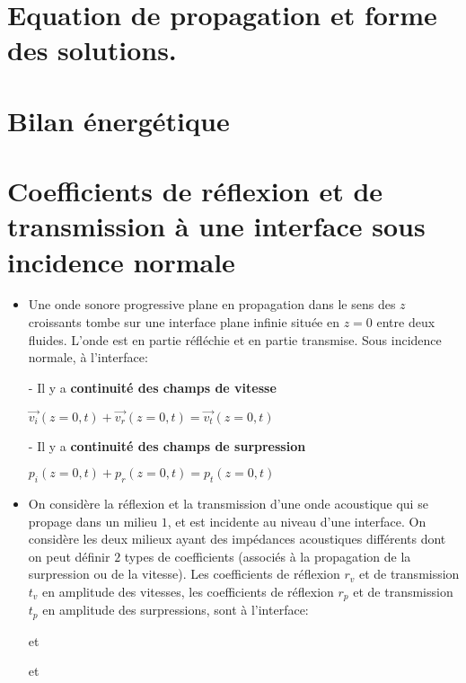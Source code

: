 \documentclass[a4paper]{article}
\begin{document}
\section{Equation de propagation et forme des solutions.}

\section{Bilan énergétique}

\section{Coefficients de réflexion et de transmission à une interface sous incidence normale}
\begin{itemize}
\item Une onde sonore progressive plane en propagation dans le sens des $z$ croissants tombe sur une interface plane infinie située en $z=0$ entre deux fluides. L'onde est en partie réfléchie et en partie transmise. Sous incidence normale, à l'interface:
\item[-] Il y a \textbf{continuité des champs de vitesse}
\begin{center}
$\overrightarrow{v_{i}}(z=0,t)+\overrightarrow{v_{r}}(z=0,t)=\overrightarrow{v_{t}}(z=0,t)$
\end{center}
\item[-] Il y a \textbf{continuité des champs de surpression}
\begin{center}
$p_{i}(z=0,t)+p_{r}(z=0,t)=p_{t}(z=0,t)$
\end{center}

\item On considère la réflexion et la transmission d'une onde acoustique qui se propage dans un milieu $1$, et est incidente au niveau d'une interface. On considère les deux milieux ayant des impédances acoustiques différents dont on peut définir $2$ types de coefficients (associés à la propagation de la surpression ou de la vitesse). Les coefficients de réflexion $r_{v}$ et de transmission $t_{v}$ en amplitude des vitesses, les coefficients de réflexion $r_{p}$ et de transmission $t_{p}$ en amplitude des surpressions, sont à l'interface:
\begin{center}
 et 
\end{center}
\begin{center}
 et 
\end{center}


\end{itemize}
\end{document}
